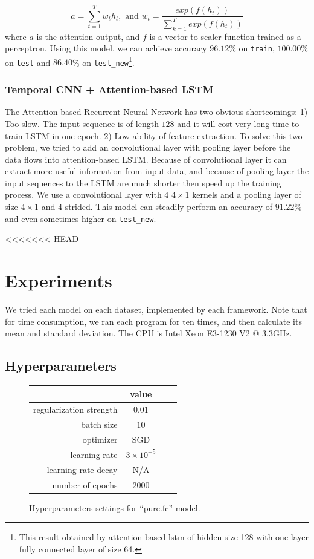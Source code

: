 \documentclass[a4paper]{article}
\begin{document}
\[ a = \sum_{t = 1}^{T} w_{t} h_t, \text{ and } w_{t} = \frac{exp(f(h_t))}{\sum_{k = 1}^{T}exp(f(h_t))}\]
where $a$ is the attention output, and $f$ is a vector-to-scaler function trained as a perceptron. Using this model, we can achieve accuracy $96.12\%$ on \texttt{train}, $100.00\%$ on  \texttt{test} and $86.40$\% on \texttt{test\_new}\footnote{This result obtained by attention-based lstm of hidden size 128 with one layer fully connected layer of size 64.}.

\subsubsection{Temporal CNN + Attention-based LSTM}
The Attention-based Recurrent Neural Network has two obvious shortcomings: 1) Too slow. The input sequence is of length $128$ and it will cost very long time to train LSTM in one epoch. 2) Low ability of feature extraction. To solve this two problem, we tried to add an convolutional layer with pooling layer before the data flows into attention-based LSTM. Because of convolutional layer it can extract more useful information from input data, and because of pooling layer the input sequences to the LSTM are much shorter then speed up the training process.
We use a convolutional layer with 4 $4\times 1$ kernels and a pooling layer of size $4 \times 1$ and $4$-strided. This model can steadily perform an accuracy of $91.22$\% and even sometimes higher on \texttt{test\_new}.

<<<<<<< HEAD
\section{Experiments}

We tried each model on each dataset, implemented by each framework.
Note that for time consumption, we ran each program for ten times, and then calculate its mean and standard deviation.
The CPU is Intel Xeon E3-1230 V2 @ 3.3GHz.

\subsection{Hyperparameters}

\begin{figure}[H]
\centering
\begin{tabular}{|r|c|c|c|}
\hline
 & value \\
\hline
regularization strength & $0.01$ \\
\hline
batch size & $10$ \\
\hline
optimizer & SGD \\
\hline
learning rate & $3\times10^{-5}$\\
\hline
learning rate decay & N/A \\
\hline
number of epochs & $2000$ \\
\hline
\end{tabular}
\caption{Hyperparameters settings for ``pure.fc'' model.}
\end{figure}
\end{document}
